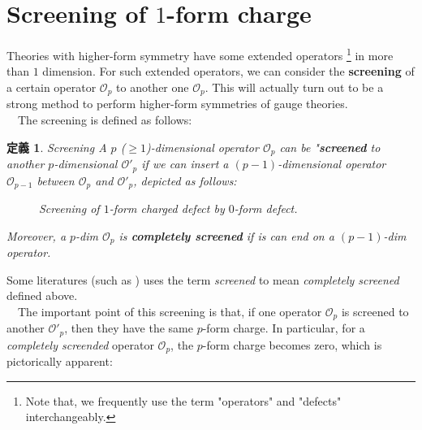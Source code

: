 \documentclass{ltjsarticle}
\theoremstyle{mystyle} %
\newtheorem{definition}{定義}[section]
\numberwithin{equation}{section}
\begin{document}
\section{Screening of $1$-form charge}
Theories with higher-form symmetry have some extended operators
\footnote{Note that, we frequently use the term "operators" and "defects" interchangeably. } in more than $1$ dimension. 
For such extended operators, we can consider the \textbf{screening} of a certain operator $\mathcal{O}_p$ to another one $\mathcal{O}_p$. 
This will actually turn out to be a strong method to perform higher-form symmetries of gauge theories. \\
　The screening is defined as follows: 
\begin{definition}{Screening}
    A $p$ ($\geq 1$)-dimensional operator $\mathcal{O}_p$ can be "\textbf{screened} 
    to another $p$-dimensional $\mathcal{O}'_p$ if we can insert a $(p-1)$-dimensional operator $\mathcal{O}_{p-1}$ 
    between $\mathcal{O}_p$ and $\mathcal{O}'_p$, depicted as follows: 
    \begin{figure}[H]
        \centering
        \caption{Screening of $1$-form charged defect by $0$-form defect. }
    \end{figure}
    Moreover, a $p$-dim $\mathcal{O}_p$ is \textbf{completely screened} if 
    is can end on a $(p-1)$-dim operator.       
\end{definition}
Some literatures (such as \cite{SSN}) uses the term \textit{screened} to mean \textit{completely screened} 
defined above. \\
　The important point of this screening is that, 
if one operator $\mathcal{O}_p$ is screened to another $\mathcal{O}'_p$, then they have the same $p$-form charge. 
In particular, for a \textit{completely screended} operator $\mathcal{O}_p$,
 the $p$-form charge becomes zero, which is pictorically apparent: 
\end{document}
